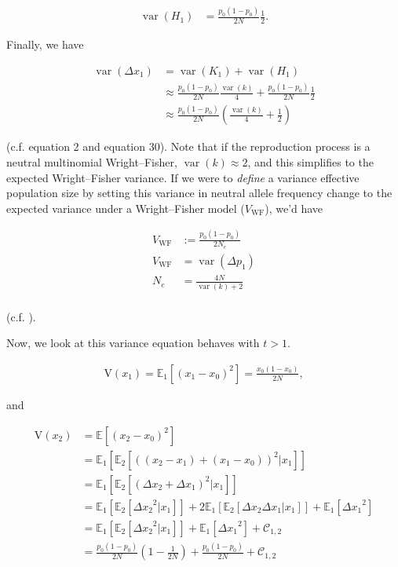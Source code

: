 \documentclass[11pt]{article}
\newcommand{\E}{\mathbb{E}}
\newcommand{\V}{\text{V}}
\DeclareMathOperator{\var}{var}
\begin{document}
\begin{align}
  \var(H_1) &= \frac{p_0(1-p_0)}{2N} \frac{1}{2}.
\end{align}

Finally, we have

\begin{align}
  \var(\Delta x_1) &= \var(K_1) + \var(H_1) \\
  &\approx \frac{p_0(1-p_0)}{2N} \frac{\var(k)}{4} + \frac{p_0(1-p_0)}{2N} \frac{1}{2} \\
                   &\approx \frac{p_0(1-p_0)}{2N}\left(\frac{\var(k)}{4} + \frac{1}{2}\right)
\end{align}

(c.f. \cite{Santiago1995-hx} equation 2 and \cite{Buffalo2019-qs} equation 30).
Note that if the reproduction process is a neutral multinomial Wright--Fisher,
$\var(k) \approx 2$, and this simplifies to the expected Wright--Fisher
variance. If we were to \emph{define} a variance effective population size by
setting this variance in neutral allele frequency change to the expected
variance under a Wright--Fisher model ($V_\text{WF}$), we'd have

\begin{align}
  V_\text{WF} &:= \frac{p_0(1-p_0)}{2N_e} \\
  V_\text{WF} &= \var(\Delta p_1) \\
  N_e &= \frac{4N}{\var(k) + 2} \\
\end{align}

(c.f. \cite{Wright1938-tv}).

Now, we look at this variance equation behaves with $t > 1$. 

\begin{align}
  \V(x_1) = \E_1\left[(x_1 - x_0)^2\right]= \frac{x_0(1-x_0)}{2N},
\end{align}

and

\begin{align}
  \label{eq:var_wf}
  \V(x_2) &= \E\left[(x_2 - x_0)^2\right] \\
          &= \E_1\left[\E_2\left[((x_2-x_1) + (x_1 - x_0))^2 | x_1\right]\right] \\
          &= \E_1\left[\E_2\left[(\Delta x_2 + \Delta x_1)^2 | x_1\right]\right] \\
          &= \E_1\left[\E_2\left[{\Delta x_2}^2|x_1\right]\right] + 2\E_1\left[\E_2[\Delta x_2 \Delta x_1 | x_1]\right] + \E_1\left[ {\Delta x_1}^2\right] \\
          &= \E_1\left[\E_2\left[{\Delta x_2}^2|x_1\right]\right] + \E_1\left[ {\Delta x_1}^2\right] + \mathcal{C}_{1,2} \\
          &= \frac{p_0(1-p_0)}{2N}\left(1 - \frac{1}{2N}\right) + \frac{p_0(1-p_0)}{2N} + \mathcal{C}_{1,2}
\end{align}
\end{document}
